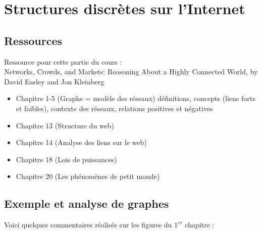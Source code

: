 \chapter{Structures discrètes sur l'Internet}

\section{Ressources}
Ressource pour cette partie du cours :\\
Networks, Crowds, and Markets: Reasoning About a Highly Connected World, by David Easley and Jon Kleinberg

\begin{itemize}
\item Chapitre 1-5 (Graphe = modèle des réseaux) définitions, concepts (liens forts et faibles), contexte des réseaux, relations positives et négatives
\item Chapitre 13 (Structure du web)
\item Chapitre 14 (Analyse des liens sur le web)
\item Chapitre 18 (Lois de puissances)
\item Chapitre 20 (Les phénomènes de petit monde)
\end{itemize}

\section{Exemple et analyse de graphes}
Voici quelques commentaires réalisés sur les figures du $1^{er}$ chapitre :

